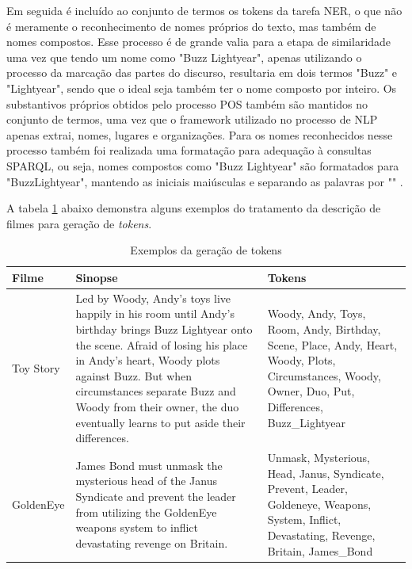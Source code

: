 Em seguida é incluído ao conjunto de termos os tokens da tarefa \ac{NER}, o que não é meramente o reconhecimento de nomes próprios do texto, mas também de nomes compostos. Esse processo é de grande valia para a etapa de similaridade uma vez que tendo um nome como "Buzz Lightyear", apenas utilizando o processo da marcação das partes do discurso, resultaria em dois termos "Buzz" e "Lightyear", sendo que o ideal seja também ter o nome composto por inteiro. Os substantivos próprios obtidos pelo processo \ac{POS} também são mantidos no conjunto de termos, uma vez que o framework utilizado no processo de \ac{NLP} apenas extrai, nomes, lugares e organizações. Para os nomes reconhecidos nesse processo também foi realizada uma formatação para adequação à consultas \ac{SPARQL}, ou seja, nomes compostos como "Buzz Lightyear" são formatados para "Buzz\textunderscore Lightyear", mantendo as iniciais maiúsculas e separando as palavras por "\textunderscore" .

A tabela \ref{tab:nlp_example} abaixo demonstra alguns exemplos do tratamento da descrição de filmes para geração de \textit{tokens}. 

\begin{table}[]
	\centering
	\caption{Exemplos da geração de tokens}
	\def\arraystretch{1.3} %
	\begin{tabular}{|p{2cm}|p{6cm}|p{6cm}|}
	\hline
	\textbf{Filme} & \textbf{Sinopse} & \textbf{Tokens} \\ \hline
	Toy Story & Led by Woody, Andy's toys live happily in his room until Andy's birthday brings Buzz Lightyear onto the scene. Afraid of losing his place in Andy's heart, Woody plots against Buzz. But when circumstances separate Buzz and Woody from their owner, the duo eventually learns to put aside their differences.& Woody, Andy, Toys, Room, Andy, Birthday, Scene, Place, Andy, Heart, Woody, Plots, Circumstances, Woody, Owner, Duo, Put, Differences, Buzz\_Lightyear \\ \hline
	GoldenEye & James Bond must unmask the mysterious head of the Janus Syndicate and prevent the leader from utilizing the GoldenEye weapons system to inflict devastating revenge on Britain. & Unmask, Mysterious, Head, Janus, Syndicate, Prevent, Leader, Goldeneye, Weapons, System, Inflict, Devastating, Revenge, Britain, James\_Bond \\ \hline
	\end{tabular}
\label{tab:nlp_example}
\end{table}

